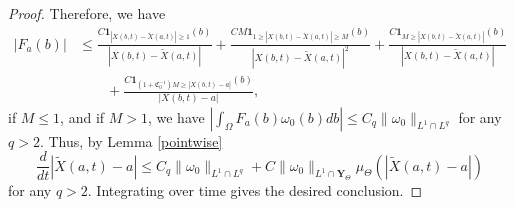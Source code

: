 \documentclass[12pt]{article}
\begin{document}
\begin{proof}
Therefore, we have
\begin{equation*}
\begin{split}
|F_a (b) | &\le   \frac{C\mathbf{1}_{ |X(b,t) - \tilde{X}(a,t) | \ge 1 } (b) }{| X(b,t) - \tilde{X} (a,t) |} +  \frac{CM \mathbf{1}_{1 \ge |X(b,t) - \tilde{X}(a,t) | \ge M } (b) }{|X(b,t) - \tilde{X}(a,t) |^2 } +  \frac{C \mathbf{1}_{M \ge |X(b,t) - \tilde{X}(a,t) | } (b) }{|X(b,t) - \tilde{X}(a,t) | } \\
&\qquad + \frac{C\mathbf{1}_{(1+\mathfrak{C}_0^{-1}) M \ge |X(b,t) - a | } (b) }{|X(b,t) - a | },
\end{split}
\end{equation*}
if $M \le 1$, and if $M>1$, we have $\left |\int_{\Omega} F_a (b) \omega_0 (b) db \right | \le C_q \| \omega_0 \| _{L^1 \cap L^q}$ for any $q>2$.
Thus, by Lemma \ref{pointwise}
\begin{equation}
\frac{d}{dt} |\tilde{X}(a,t) - a|  \le C_q \| \omega_0 \|_{L^1 \cap L^q} + C \| \omega_0 \| _{L^1 \cap \mathbf{Y}_{\Theta} } \mu_{\Theta} (|\tilde{X}(a,t) - a|)
\end{equation} 
for any $q > 2$. Integrating over time gives the desired conclusion.
\end{proof}
\end{document}
